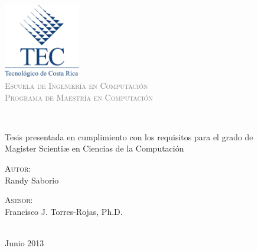 \begin{titlepage}

\begin{center}
 
\includegraphics[width=0.25\textwidth]{images/logotec}
\\[0.2cm]
\textcolor{gray}{%
\textsc{\Large Escuela de Ingeniería en Computación}\\[0.2cm]
\textsc{\large Programa de Maestría en Computación}\\}
\vfill

\doublespacing
{\LARGE \bfseries \thesistitle}
\\[2cm]
\singlespacing

{\normalsize Tesis presentada en cumplimiento con los requisitos para el grado de \\
Magister Scientiæ en Ciencias de la Computación}
\\
\vfill
 
\begin{minipage}{0.45\textwidth}
\begin{flushleft} \large
\textsc{Autor:}\\
{Randy Saborio}
\end{flushleft}
\end{minipage}
\begin{minipage}{0.50\textwidth}
\begin{flushright} \large
\textsc{Asesor:}\\
{Francisco J. Torres-Rojas, Ph.D.}
\end{flushright}
\end{minipage}
\\[1cm]
 
{\large Junio 2013}
\end{center}
\end{titlepage}